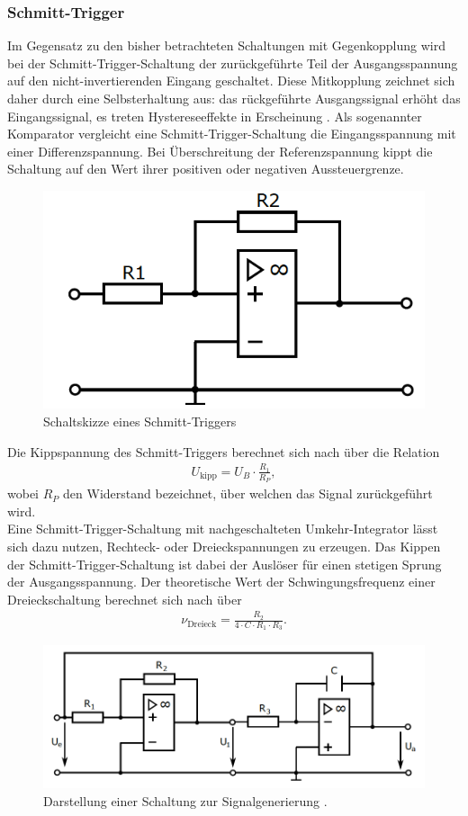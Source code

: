 \subsubsection{Schmitt-Trigger}
\noindent Im Gegensatz zu den bisher betrachteten Schaltungen mit Gegenkopplung
wird bei der Schmitt-Trigger-Schaltung der zurückgeführte Teil der
Ausgangsspannung auf den nicht-invertierenden Eingang geschaltet. Diese Mitkopplung
zeichnet sich daher durch eine Selbsterhaltung aus: das rückgeführte
Ausgangssignal erhöht das Eingangssignal, es treten Hystereseeffekte in
Erscheinung \cite{elektrotechnik}. Als sogenannter Komparator vergleicht eine
Schmitt-Trigger-Schaltung die Eingangsspannung mit einer Differenzspannung.
Bei Überschreitung der Referenzspannung kippt die Schaltung auf den Wert ihrer
positiven oder negativen Aussteuergrenze.
\begin{figure}
  \centering
  \includegraphics[scale=0.5]{ressources/figure_06.png}
  \caption{Schaltskizze eines Schmitt-Triggers \cite{sample}}
  \label{fig:06}
\end{figure}
\noindent Die Kippspannung des Schmitt-Triggers berechnet sich nach \cite{federau}
über die Relation
\begin{align}
  U_\text{kipp} = U_B \cdot \frac{R_1}{R_P},
  \label{eqn:09}
\end{align}
wobei $R_P$ den Widerstand bezeichnet, über welchen das Signal zurückgeführt
wird. \\
\noindent Eine Schmitt-Trigger-Schaltung mit nachgeschalteten Umkehr-Integrator
lässt sich dazu nutzen, Rechteck- oder Dreieckspannungen zu erzeugen.
Das Kippen der Schmitt-Trigger-Schaltung ist dabei der Auslöser für einen
stetigen Sprung der Ausgangsspannung. Der theoretische Wert der Schwingungsfrequenz
einer Dreieckschaltung berechnet sich nach \cite{sample} über
\begin{align}
  \nu_\text{Dreieck} = \frac{R_2}{4 \cdot C \cdot R_1 \cdot R_3}.
  \label{eqn:10}
\end{align}
\begin{figure}
  \centering
  \includegraphics{ressources/figure_07.png}
  \caption{Darstellung einer Schaltung zur Signalgenerierung \cite{sample}.}
  \label{fig:07}
\end{figure}
